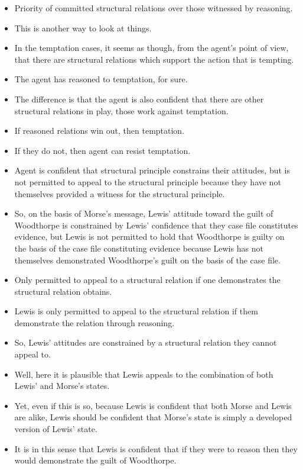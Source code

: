 \documentclass[10pt]{article}
\begin{document}
\begin{itemize}
\item Priority of committed structural relations over those witnessed by reasoning.
\item This is another way to look at things.
\item In the temptation cases, it seems as though, from the agent's point of view, that there are structural relations which support the action that is tempting.
\item The agent has reasoned to temptation, for sure.
\item The difference is that the agent is also confident that there are other structural relations in play, those work against temptation.
\item If reasoned relations win out, then temptation.
\item If they do not, then agent can resist temptation.
\end{itemize}


\newpage

\begin{itemize}
\item Agent is confident that structural principle constrains their attitudes, but is not permitted to appeal to the structural principle because they have not themselves provided a witness for the structural principle.
\item So, on the basis of Morse's message, Lewis' attitude toward the guilt of Woodthorpe is constrained by Lewis' confidence that they case file constitutes evidence, but Lewis is not permitted to hold that Woodthorpe is guilty on the basis of the case file constituting evidence because Lewis has not themselves demonstrated Woodthorpe's guilt on the basis of the case file.
\item Only permitted to appeal to a structural relation if one demonstrates the structural relation obtains.
\item Lewis is only permitted to appeal to the structural relation if them demonstrate the relation through reasoning.
\item So, Lewis' attitudes are constrained by a structural relation they cannot appeal to.
\item Well, here it is plausible that Lewis appeals to the combination of both Lewis' and Morse's states.
\item Yet, even if this is so, because Lewis is confident that both Morse and Lewis are alike, Lewis should be confident that Morse's state is simply a developed version of Lewis' state.
\item It is in this sense that Lewis is confident that if they were to reason then they would demonstrate the guilt of Woodthorpe.
\end{itemize}
\end{document}
